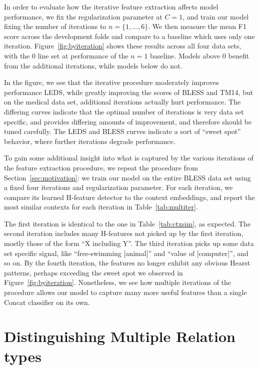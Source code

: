 In order to evaluate how the iterative feature extraction affects model
performance, we fix the regularization parameter at $C = 1$, and train our
model fixing the number of iterations to $n = \{1, \ldots, 6\}$.
We then measure the mean F1 score across the development folds and compare to a
baseline which uses only one iteration. Figure~\ref{fig:byiteration} shows
these results across all four data sets, with the 0 line set at performance of
the $n = 1$ baseline. Models above 0 benefit from the additional
iterations, while models below do not.

In the figure, we see that the iterative procedure moderately improves
performance LEDS, while greatly improving the scores of BLESS and TM14, but
on the medical data set, additional iterations actually hurt performance.
The differing curves indicate that the optimal number of iterations is very
data set specific, and provides differing amounts of improvement, and therefore
should be tuned carefully. The LEDS and BLESS curves indicate a sort of
``sweet spot'' behavior, where further iterations degrade performance.

To gain some additional insight into what is captured by the various iterations
of the feature extraction procedure, we repeat the procedure from
Section~\ref{sec:motivation}: we train our model on the entire BLESS data set
using a fixed four iterations and regularization parameter. For each iteration,
we compare its learned H-feature detector to the context embeddings, and report
the most similar contexts for each iteration in Table~\ref{tab:multiter}.

The first iteration is
identical to the one in Table~\ref{tab:ctxsim}, as expected. The second
iteration includes many H-features not picked up by the first iteration,
mostly those of the form ``X including Y''. The third iteration picks up some
data set specific signal, like ``free-swimming [animal]'' and
``value of [computer]'', and so on. By the fourth iteration, the features
no longer exhibit any obvious Hearst patterns, perhaps exceeding the sweet
spot we observed in Figure~\ref{fig:byiteration}.
Nonetheless, we see how multiple iterations of the procedure allows our model
to capture many more useful features than a single Concat classifier on its
own.

\section{Distinguishing Multiple Relation types}

